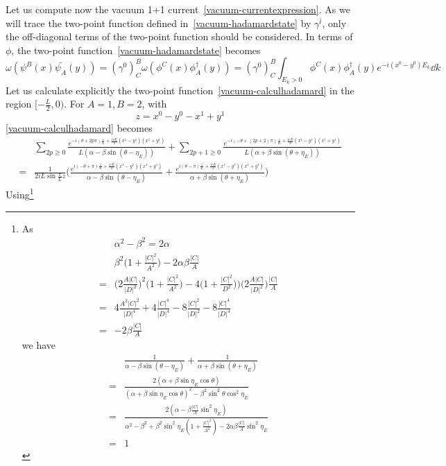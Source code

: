 Let us compute now the vacuum 1+1 current~\cref{vacuum-currentexpression}.
As we will trace the two-point function defined in~\cref{vacuum-hadamardstate} by $\gamma^i$, 
only the off-diagonal terms of the two-point function should be considered.
In terms of $\phi$, 
the two-point function~\cref{vacuum-hadamardstate} becomes
\begin{equation}\label{vacuum-calculhadamard}
\omega(\psi^B(x) \bar{\psi_A}(y)) = 
(\gamma^0)^B_C \omega(\phi^C(x) \phi^\dagger_A(y)) = (\gamma^0)^B_C
\int_{E_k > 0} \phi^C(x) \phi^\dagger_A(y) e^{-i(x^0 - y^0) E_k} \dd k
\end{equation}
Let us calculate explicitly the two-point function~\cref{vacuum-calculhadamard} in the region $[-\frac L 2,0)$. 
For $A =1, B= 2$, 
with 
\begin{equation*}
z =x^0 - y^0 - x^1 +y^1
\end{equation*}
\cref{vacuum-calculhadamard} becomes
\begin{equation*}
\begin{split}
& \sum_{2p \geq 0} \frac{e^{-i(\theta + 2p\pi)\frac{z}{L}+ \frac{ieE}{2}(x^1 - y^1)(x^1+y^1)} }{L(\alpha - \beta \sin (\theta - \eta_E))} 
+ \sum_{2p+1 \geq 0} \frac{e^{-i(- \theta + (2p+2)\pi)\frac{z}{L}+ \frac{ieE}{2}(x^1 - y^1)(x^1+y^1)}}{L(\alpha + \beta \sin (\theta + \eta_E))}\\
%
=& 
\frac{1}{2i L\sin\frac{\pi}{L}z} \bigg( \frac{e^{i(-\theta + \pi)\frac{z}{L}+ \frac{ieE}{2}(x^1 - y^1)(x^1+y^1)}}{\alpha - \beta \sin (\theta - \eta_E)}
+ \frac{e^{i(\theta - \pi) \frac{z}{L}+ \frac{ieE}{2}(x^1 - y^1)(x^1+y^1)}}{\alpha + \beta \sin (\theta + \eta_E)}
\bigg)
\end{split}
\end{equation*}
Using\footnote{
As
\begin{equation*}
\begin{split}
& \alpha^2 - \beta ^ 2 = 2 \alpha \\
&  \beta^2 \big(1 + \frac{|C|^2}{A^2} \big) - 2 \alpha \beta \frac{|C|}{A} \\
= & \big(2\frac{A |C|}{|D|^2} \big)^2 \big( 1+ \frac{|C|^2}{A^2} \big) - 4\big( 1+ \frac{|C|^2}{D^2}))\big(2\frac{A |C|}{|D|^2} \big) \frac{|C|}{A}  \\
= & 4 \frac{A^2 |C|^2}{|D|^4} + 4\frac{|C|^4}{|D|^4} - 8\frac{|C|^2}{|D|^2} - 8\frac{|C|^4}{|D|^4} \\
= & -2 \beta \frac{|C|}{A}
\end{split}
\end{equation*}
we have
\begin{equation*}
\begin{split}
& \frac{1}{\alpha - \beta \sin (\theta - \eta_E)}
   + \frac{1}{\alpha + \beta \sin (\theta + \eta_E)} \\
= & \frac{2(\alpha + \beta \sin \eta_E \cos \theta)}{(\alpha + \beta \sin \eta_E \cos \theta)^2 - \beta^2 \sin^2 \theta \cos^2 \eta_E} \\
= & \frac{2(\alpha - \beta \frac{|C|}{A} \sin^2 \eta_E)}{\alpha^2 - \beta^2 + \beta^2 \sin^2 \eta_E (1 + \frac{|C|^2}{A^2}) - 2 \alpha \beta \frac{|C|}{A} \sin^2 \eta_E} \\
=& 1
\end{split}
\end{equation*}
}
